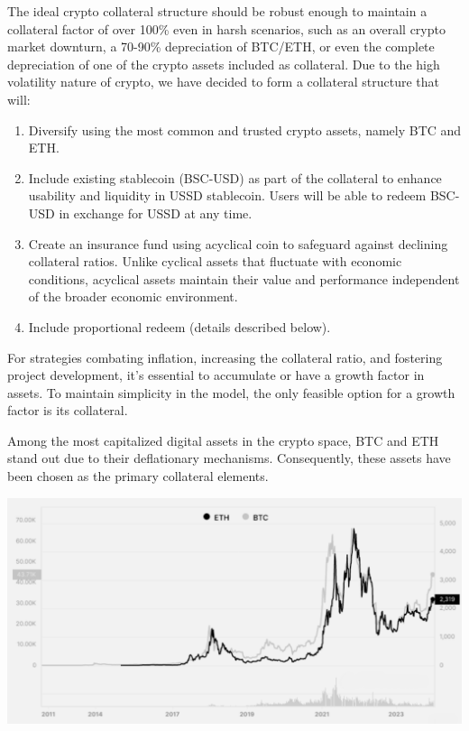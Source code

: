 The ideal crypto collateral structure should be robust enough to maintain a collateral factor of over 100\% even in harsh scenarios, such as an overall crypto market downturn, a 70-90\% depreciation of BTC/ETH, or even the complete depreciation of one of the crypto assets included as collateral. Due to the high volatility nature of crypto, we have decided to form a collateral structure that will:
\begin{enumerate}
    \item Diversify using the most common and trusted crypto assets, namely BTC and ETH.
    \item Include existing stablecoin (BSC-USD) as part of the collateral to enhance usability and liquidity in USSD stablecoin. Users will be able to redeem BSC-USD in exchange for USSD at any time. 
    \item Create an insurance fund using acyclical coin to safeguard against declining collateral ratios. Unlike cyclical assets that fluctuate with economic conditions, acyclical assets maintain their value and performance independent of the broader economic environment.
    \item Include proportional redeem (details described below).
\end{enumerate}

For strategies combating inflation, increasing the collateral ratio, and fostering project development, it's essential to accumulate or have a growth factor in assets. To maintain simplicity in the model, the only feasible option for a growth factor is its collateral.

Among the most capitalized digital assets in the crypto space, BTC and ETH stand out due to their deflationary mechanisms. Consequently, these assets have been chosen as the primary collateral elements.

\centerline{\includegraphics[scale=0.35]{image02.png}}

